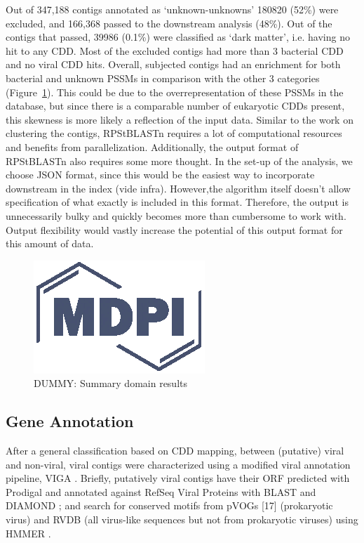   Out of 347,188 contigs annotated as ‘unknown-unknowns’ 180820 (52\%) were
  excluded, and 166,368 passed to the downstream analysis (48\%). Out of the
  contigs that passed, 39986 (0.1\%) were classified as ‘dark matter’, i.e.
  having no hit to any CDD. Most of the excluded contigs had more than 3
  bacterial CDD and no viral CDD hits. Overall, subjected contigs had an
  enrichment for both bacterial and unknown PSSMs in comparison with the other
  3 categories (Figure~\ref{fig:domain_summary}). This could be due to the
  overrepresentation of these PSSMs in the
  database, but since there is a comparable number of eukaryotic CDDs present,
  this skewness is more likely a reflection of the input data. Similar to the
  work on clustering the contigs, RPStBLASTn requires a lot of computational
  resources and benefits from parallelization. Additionally, the output format
  of RPStBLASTn also requires some more thought. In the set-up of the analysis,
  we choose JSON \cite{rfc_json} format, since this would be the easiest way to
  incorporate downstream in the index (vide infra). However,the algorithm
  itself doesn’t allow specification of what exactly is included in this
  format. Therefore, the output is unnecessarily bulky and quickly becomes more
  than cumbersome to work with. Output flexibility would vastly increase the
  potential of this output format for this amount of data.

  \begin{figure}
    \centering
    \includegraphics{Definitions/logo-mdpi}
    \caption{DUMMY: Summary domain results
            \label{fig:domain_summary}}
  \end{figure}

  \subsection{Gene Annotation}
  After a general classification based on CDD mapping, between (putative)
  viral and non-viral, viral contigs were characterized using a modified viral
  annotation pipeline, VIGA \cite{Gonzalez-Tortuero2018}. Briefly, putatively
  viral contigs have their ORF predicted with Prodigal \cite{Hyatt2010} and
  annotated against RefSeq Viral Proteins with BLAST \citep{Camacho2009} and
  DIAMOND \citep{Buchfink2015}; and search for conserved motifs
  from pVOGs [17] (prokaryotic virus) and RVDB \cite{Goodacre2018}
  (all virus-like sequences but not from prokaryotic viruses) using HMMER
  \cite{hmmer}.

